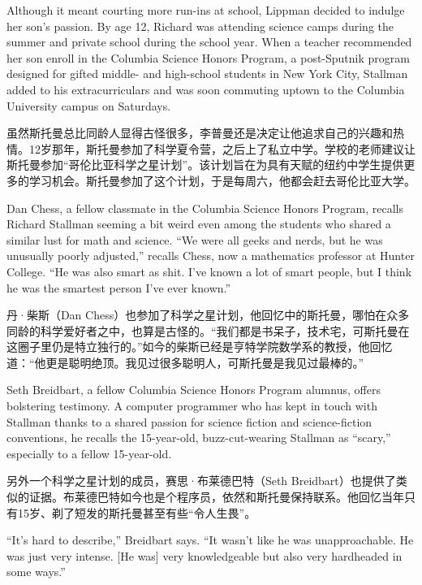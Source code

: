 \ifdefined\eng
Although it meant courting more run-ins at school, Lippman decided to indulge her son's passion. By age 12, Richard was attending science camps during the summer and private school during the school year. When a teacher recommended her son enroll in the Columbia Science Honors Program, a post-Sputnik program designed for gifted middle- and high-school students in New York City, Stallman added to his extracurriculars and was soon commuting uptown to the Columbia University campus on Saturdays.
\fi

\ifdefined\chs
虽然斯托曼总比同龄人显得古怪很多，李普曼还是决定让他追求自己的兴趣和热情。12岁那年，斯托曼参加了科学夏令营，之后上了私立中学。学校的老师建议让斯托曼参加``哥伦比亚科学之星计划''。该计划旨在为具有天赋的纽约中学生提供更多的学习机会。斯托曼参加了这个计划，于是每周六，他都会赶去哥伦比亚大学。
\fi

\ifdefined\eng
Dan Chess, a fellow classmate in the Columbia Science Honors Program, recalls Richard Stallman seeming a bit weird even among the students who shared a similar lust for math and science. ``We were all geeks and nerds, but he was unusually poorly adjusted,'' recalls Chess, now a mathematics professor at Hunter College. ``He was also smart as shit. I've known a lot of smart people, but I think he was the smartest person I've ever known.''
\fi

\ifdefined\chs
丹·柴斯（Dan Chess）也参加了科学之星计划，他回忆中的斯托曼，哪怕在众多同龄的科学爱好者之中，也算是古怪的。``我们都是书呆子，技术宅，可斯托曼在这圈子里仍是特立独行的。''如今的柴斯已经是亨特学院数学系的教授，他回忆道：``他更是聪明绝顶。我见过很多聪明人，可斯托曼是我见过最棒的。''
\fi

\ifdefined\eng
Seth Breidbart, a fellow Columbia Science Honors Program alumnus, offers bolstering testimony. A computer programmer who has kept in touch with Stallman thanks to a shared passion for science fiction and science-fiction conventions, he recalls the 15-year-old, buzz-cut-wearing Stallman as ``scary,'' especially to a fellow 15-year-old.
\fi

\ifdefined\chs
另外一个科学之星计划的成员，赛思·布莱德巴特（Seth Breidbart）也提供了类似的证据。布莱德巴特如今也是个程序员，依然和斯托曼保持联系。他回忆当年只有15岁、剃了短发的斯托曼甚至有些``令人生畏''。
\fi

\ifdefined\eng
``It's hard to describe,'' Breidbart says. ``It wasn't like he was unapproachable. He was just very intense. [He was] very knowledgeable but also very hardheaded in some ways.''
\fi

